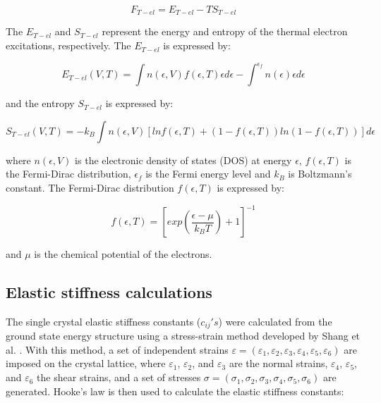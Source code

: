 \begin{equation}
\label{eq:thermalelectronic}
F_{T-el} = E_{T-el} - T S_{T-el}
\end{equation}

\noindent The $E_{T-el}$ and $S_{T-el}$ represent the energy and entropy of the thermal electron excitations, respectively. The $E_{T-el}$ is expressed by:

\begin{equation}
\label{eq:etel}
E_{T-el} (V,T) = \int n\left(\epsilon, V\right) f \left(\epsilon, T\right) \epsilon d \epsilon - \int^{\epsilon_{f}} n (\epsilon) \epsilon d \epsilon
\end{equation}

\noindent and the entropy $S_{T-el}$ is expressed by:

\begin{equation}
\label{eq:sel}
S_{T-el} (V,T) = -k_{B} \int n(\epsilon, V) \left[ ln f \left(\epsilon,T\right) + \left( 1 - f(\epsilon, T) \right) ln \left( 1 - f \left(\epsilon, T \right) \right) \right] d\epsilon 
\end{equation}

\noindent where $n(\epsilon, V)$ is the electronic density of states (DOS) at energy $\epsilon$,  $f (\epsilon,T)$ is the Fermi-Dirac distribution, $\epsilon_{f}$ is the Fermi energy level and $k_{B}$ is Boltzmann's constant. The Fermi-Dirac distribution $f (\epsilon, T)$ is expressed by:

\begin{equation}
\label{eq:fermidirac}
f (\epsilon,T) = \left[ exp \left( \frac{\epsilon - \mu}{k_{B} T} \right) + 1 \right]^{-1}
\end{equation}

\noindent and $\mu$ is the chemical potential of the electrons. 


\subsection{Elastic stiffness calculations}

The single crystal elastic stiffness constants ($c_{ij}$$'s$) were calculated from the ground state energy structure using a stress-strain method developed by Shang et al. \cite{Shang2007c}. With this method, a set of independent strains $\varepsilon = (\varepsilon_{1}, \varepsilon_{2}, \varepsilon_{3}, \varepsilon_{4}, \varepsilon_{5}, \varepsilon_{6})$ are imposed on the crystal lattice, where $\varepsilon_{1}$, $\varepsilon_{2}$, and $\varepsilon_{3}$ are the normal strains, $\varepsilon_{4}$, $\varepsilon_{5}$, and $\varepsilon_{6}$ the shear strains, and a set of stresses $\sigma = (\sigma_{1}, \sigma_{2}, \sigma_{3}, \sigma_{4}, \sigma_{5},\sigma_{6})$ are generated. Hooke's law is then used to calculate the elastic stiffness constants: 

